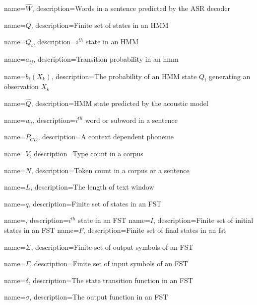 {   name=$\widehat{W}$,
    description={Words in a sentence predicted by the ASR decoder}
}

{   name=$Q$,
    description={Finite set of states in an  HMM}
}

{   name=$Q_i$,
    description={$i^{th}$ state in an HMM}
}

{   name=$a_{ij}$,
    description={Transition probability in an \acrshort{hmm}}
}

{   name=$b_i(X_k)$,
    description={The probability of an HMM state $Q_i$ generating an observation $X_k$}
}

{   name=$\widehat{Q}$,
    description={HMM state predicted by the acoustic model}
}

{   name=$w_i$,
    description={$i^{th}$ word or subword in a sentence}
}


{   name=$P_{CD}$,
    description={A context dependent phoneme}
}

{   name=$V$,
    description={Type count in a corpus}
}

{   name=$N$,
    description={Token count in a corpus or a sentence}
}

{   name=$L$,
    description={The length of text window}
}

{   name=$q$,
    description={Finite set of states in an  FST}
}

{   name=,
    description={$i^{th}$ state in an FST}
}
{   name=$I$,
    description={Finite set of initial states in an FST}
}
{   name=$F$,
    description={Finite set of final states in an \acrshort{fst}}
}


{   name=$\Sigma$,
    description={Finite set of output symbols of an FST}
}

{   name=$\Gamma$,
    description={Finite set of input symbols of an FST}
}

{   name=$\delta$,
    description={The state transition function in an FST}
}

{   name=$\sigma$,
    description={The output function in an FST}
}


